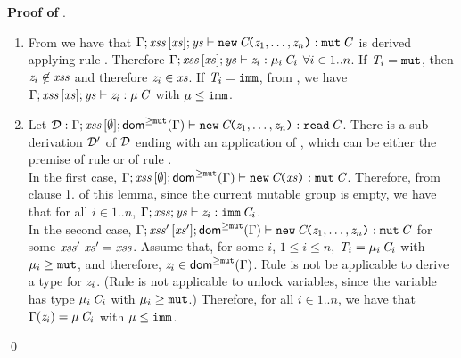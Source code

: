 \medskip
\noindent
{\bf Proof of }.
\begin{enumerate}
\item
From  we have that $\Gamma;\mathit{xss}\,[\mathit{xs}];\mathit{ys}\vdash \texttt{new}\,\mathit{C}\!\texttt{(}\mathit{z}_1,\ldots,\mathit{z}_n\texttt{)}:\texttt{mut}\,\mathit{C}$ is derived applying rule . Therefore  $\Gamma;\mathit{xss}\,[\mathit{xs}];\mathit{ys}\vdash \mathit{z}_i:\mu_i\,\mathit{C}_i$ $\forall i\in1..n$.
If $\mathit{T}_i=\texttt{mut}$, then $\mathit{z}_i\not\in\mathit{xss}$ and therefore $\mathit{z}_i\in\mathit{xs}$. If $\mathit{T}_i=\texttt{imm}$, from 
, we have $\Gamma;\mathit{xss}\,[\mathit{xs}];\mathit{ys}\vdash \mathit{z}_i:\mu\,\mathit{C}$ with $\mu\leq\texttt{imm}$.
\item 
Let  ${\cal D}:\Gamma;\mathit{xss}\,[\emptyset];{\textsf{dom}^{\geq\texttt{mut}}}(\Gamma) \vdash \texttt{new}\,\mathit{C}\!\texttt{(}\mathit{z}_1,\ldots,\mathit{z}_n\texttt{)}:\texttt{read}\,\mathit{C}$. There is a sub-derivation ${\cal D}'$ of ${\cal D}$ ending with
an application of , which can be either the premise of rule  or of rule .\\
In the first case, $\Gamma;\mathit{xss}\,[\emptyset];{\textsf{dom}^{\geq\texttt{mut}}}(\Gamma) \vdash {\texttt{new}\,\mathit{C}\!\texttt{(}\mathit{xs}\texttt{)}}:\texttt{mut}\,\mathit{C}$. 
Therefore, from clause 1. of this lemma, since the current mutable group is empty, we have that
for all $i\in1..n$, $\Gamma;\mathit{xss};\mathit{ys}\vdash \mathit{z}_i:\texttt{imm}\,\mathit{C}_i$.\\
In the second case,
$\Gamma;\mathit{xss}'\,[\mathit{xs}'];{\textsf{dom}^{\geq\texttt{mut}}}(\Gamma) \vdash {\texttt{new}\,\mathit{C}\!\texttt{(}\mathit{z}_1,\ldots,\mathit{z}_n\texttt{)}}:\texttt{mut}\,\mathit{C}$ for some 
$\mathit{xss}'\ \mathit{xs}'=\mathit{xss}$.  Assume that, for some $i$, $1\leq i\leq n$,  $\mathit{T}_i=\mu_i\,\mathit{C}_i$ with
$\mu_i\geq\texttt{mut}$, and therefore, $\mathit{z}_i\in{\textsf{dom}^{\geq\texttt{mut}}}(\Gamma)$. 
Rule  is not be applicable to derive a type for $\mathit{z}_i$. (Rule  is not applicable to unlock
variables, since the variable has type $\mu_i\,\mathit{C}_i$ with $\mu_i\geq\texttt{mut}$.)
Therefore, for all $i\in1..n$, we have that
$\Gamma(\mathit{z}_i)=\mu\,\mathit{C}_i$ with $\mu\leq\texttt{imm}$. 
\end{enumerate}
\qed



